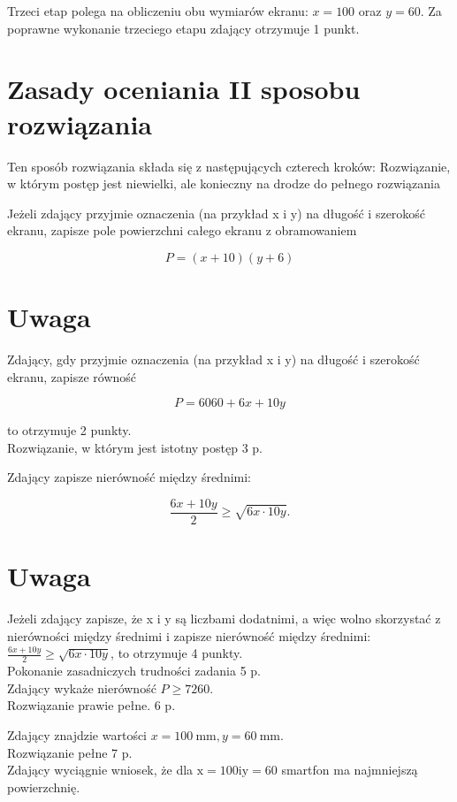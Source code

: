 \documentclass[10pt]{article}
\begin{document}
Trzeci etap polega na obliczeniu obu wymiarów ekranu: $x=100$ oraz $y=60$. Za poprawne wykonanie trzeciego etapu zdający otrzymuje 1 punkt.

\section*{Zasady oceniania II sposobu rozwiązania}
Ten sposób rozwiązania składa się z następujących czterech kroków: Rozwiązanie, w którym postęp jest niewielki, ale konieczny na drodze do pełnego rozwiązania

Jeżeli zdający przyjmie oznaczenia (na przykład x i y) na długość i szerokość ekranu, zapisze pole powierzchni całego ekranu z obramowaniem

$$
P=(x+10)(y+6)
$$

\section*{Uwaga}
Zdający, gdy przyjmie oznaczenia (na przykład x i y) na długość i szerokość ekranu, zapisze równość

$$
P=6060+6 x+10 y
$$

to otrzymuje 2 punkty.\\
Rozwiązanie, w którym jest istotny postęp 3 p.

Zdający zapisze nierówność między średnimi:

$$
\frac{6 x+10 y}{2} \geq \sqrt{6 x \cdot 10 y} .
$$

\section*{Uwaga}
Jeżeli zdający zapisze, że x i y są liczbami dodatnimi, a więc wolno skorzystać z nierówności między średnimi i zapisze nierówność między średnimi:\\
$\frac{6 x+10 y}{2} \geq \sqrt{6 x \cdot 10 y}$, to otrzymuje 4 punkty.\\
Pokonanie zasadniczych trudności zadania 5 p.\\
Zdający wykaże nierówność $P \geq 7260$.\\
Rozwiązanie prawie pełne. 6 p.

Zdający znajdzie wartości $x=100 \mathrm{~mm}, y=60 \mathrm{~mm}$.\\
Rozwiązanie pełne 7 p.\\
Zdający wyciągnie wniosek, że dla $\mathrm{x}=100 \mathrm{i} \mathrm{y}=60$ smartfon ma najmniejszą powierzchnię.
\end{document}
